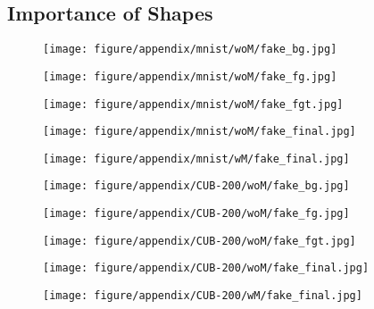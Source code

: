 \documentclass{article} \usepackage{iclr2017_conference,times}
\begin{document}
\subsection{Importance of Shapes}
\label{sec:shape}
\begin{figure}[t]
\begin{minipage}{0.195\linewidth}
\center
\texttt{[image: figure/appendix/mnist/woM/fake\_bg.jpg]}
\end{minipage}
\begin{minipage}{0.195\linewidth}
\center
\texttt{[image: figure/appendix/mnist/woM/fake\_fg.jpg]}
\end{minipage}
\begin{minipage}{0.195\linewidth}
\center
\texttt{[image: figure/appendix/mnist/woM/fake\_fgt.jpg]}
\end{minipage}
\begin{minipage}{0.195\linewidth}
\center
\texttt{[image: figure/appendix/mnist/woM/fake\_final.jpg]}
\end{minipage}
\begin{minipage}{0.195\linewidth}
\center
\texttt{[image: figure/appendix/mnist/wM/fake\_final.jpg]}
\end{minipage}

\begin{minipage}{0.195\linewidth}
\center
\texttt{[image: figure/appendix/CUB-200/woM/fake\_bg.jpg]}
\end{minipage}
\begin{minipage}{0.195\linewidth}
\center
\texttt{[image: figure/appendix/CUB-200/woM/fake\_fg.jpg]}
\end{minipage}
\begin{minipage}{0.195\linewidth}
\center
\texttt{[image: figure/appendix/CUB-200/woM/fake\_fgt.jpg]}
\end{minipage}
\begin{minipage}{0.195\linewidth}
\center
\texttt{[image: figure/appendix/CUB-200/woM/fake\_final.jpg]}
\end{minipage}
\begin{minipage}{0.195\linewidth}
\center
\texttt{[image: figure/appendix/CUB-200/wM/fake\_final.jpg]}
\end{minipage}


\end{figure}
\end{document}
